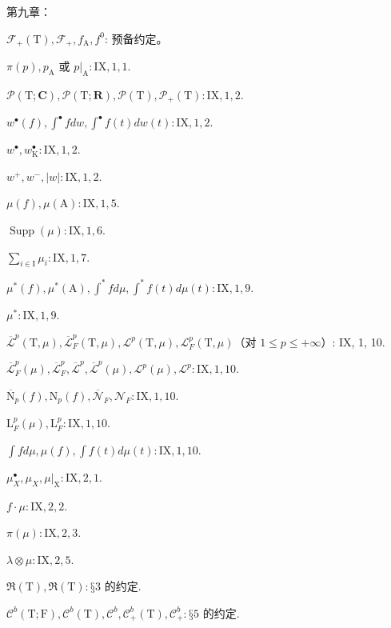 第九章：

\(\mathcal{F}_{+}(\mathrm{T}), \mathcal{F}_{+}, f_{\mathrm{A}}, f^{0}\): 预备约定。

\(\pi(p), p_{\mathrm{A}}\) 或 \(p|_{\mathrm{A}}: \mathrm{IX}, 1, 1\).

\(\mathcal{P}(\mathrm{T}; \mathbf{C}), \mathcal{P}(\mathrm{T}; \mathbf{R}), \mathcal{P}(\mathrm{T}), \mathcal{P}_{+}(\mathrm{T}): \mathrm{IX}, 1, 2\).

\(w^{\bullet}(f), \int^{\bullet} f dw, \int^{\bullet} f(t) dw(t): \mathrm{IX}, 1, 2\).

\(w^{\bullet}, w_{\mathrm{K}}^{\bullet}: \mathrm{IX}, 1, 2\).

\(w^{+}, w^{-}, |w|: \mathrm{IX}, 1, 2\).

\(\mu(f), \mu(\mathrm{A}): \mathrm{IX}, 1, 5\).

\(\operatorname{Supp}(\mu): \mathrm{IX}, 1, 6\).

\(\sum_{i \in \mathrm{I}} \mu_i: \mathrm{IX}, 1, 7\).

\(\mu^*(f), \mu^*(\mathrm{A}), \int^* f d\mu, \int^* f(t) d\mu(t): \mathrm{IX}, 1, 9\).

\(\mu^*: \mathrm{IX}, 1, 9\).

\(\overline{\mathcal{L}}^p(\mathrm{T}, \mu), \overline{\mathcal{L}}_F^p(\mathrm{T}, \mu), \mathcal{L}^p(\mathrm{T}, \mu), \mathcal{L}_F^p(\mathrm{T}, \mu)\)（对 \(1 \leqslant p \leqslant +\infty\)）: IX, 1, 10.

\(\overline{\mathcal{L}}_F^p(\mu), \overline{\mathcal{L}}_F^p, \overline{\mathcal{L}}^p, \overline{\mathcal{L}}^p(\mu), \mathcal{L}^p(\mu), \mathcal{L}^p: \mathrm{IX}, 1, 10\).

\(\overline{\mathrm{N}}_p(f), \mathrm{N}_p(f), \overline{\mathcal{N}}_F, \mathcal{N}_F: \mathrm{IX}, 1, 10\).

\(\mathrm{L}_F^p(\mu), \mathrm{L}_F^p: \mathrm{IX}, 1, 10\).

\(\int f d\mu, \mu(f), \int f(t) d\mu(t): \mathrm{IX}, 1, 10\).

\(\mu_X^\bullet, \mu_X, \mu|_{\mathrm{X}}: \mathrm{IX}, 2, 1\).

\(f \cdot \mu: \mathrm{IX}, 2, 2\).

\(\pi(\mu): \mathrm{IX}, 2, 3\).

\(\lambda \otimes \mu: \mathrm{IX}, 2, 5\).

\(\Re(\mathrm{T}), \Re(\mathrm{T}): \text{§3 的约定}\).

\(\mathcal{C}^b(\mathrm{T}; \mathrm{F}), \mathcal{C}^b(\mathrm{T}), \mathcal{C}^b, \mathcal{C}_+^b(\mathrm{T}), \mathcal{C}_+^b: \text{§5 的约定}\).

